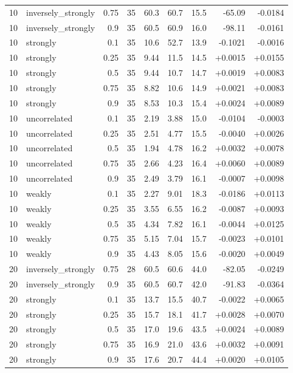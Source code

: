 \begin{tabular}{rlrrrrrrr}
10 & inversely\_strongly & 0.75 & 35 & 60.3 & 60.7 & 15.5 & -65.09 & -0.0184 \\
10 & inversely\_strongly & 0.9 & 35 & 60.5 & 60.9 & 16.0 & -98.11 & -0.0161 \\
10 & strongly & 0.1 & 35 & 10.6 & 52.7 & 13.9 & -0.1021 & -0.0016 \\
10 & strongly & 0.25 & 35 & 9.44 & 11.5 & 14.5 & +0.0015 & +0.0155 \\
10 & strongly & 0.5 & 35 & 9.44 & 10.7 & 14.7 & +0.0019 & +0.0083 \\
10 & strongly & 0.75 & 35 & 8.82 & 10.6 & 14.9 & +0.0021 & +0.0083 \\
10 & strongly & 0.9 & 35 & 8.53 & 10.3 & 15.4 & +0.0024 & +0.0089 \\
10 & uncorrelated & 0.1 & 35 & 2.19 & 3.88 & 15.0 & -0.0104 & -0.0003 \\
10 & uncorrelated & 0.25 & 35 & 2.51 & 4.77 & 15.5 & -0.0040 & +0.0026 \\
10 & uncorrelated & 0.5 & 35 & 1.94 & 4.78 & 16.2 & +0.0032 & +0.0078 \\
10 & uncorrelated & 0.75 & 35 & 2.66 & 4.23 & 16.4 & +0.0060 & +0.0089 \\
10 & uncorrelated & 0.9 & 35 & 2.49 & 3.79 & 16.1 & -0.0007 & +0.0098 \\
10 & weakly & 0.1 & 35 & 2.27 & 9.01 & 18.3 & -0.0186 & +0.0113 \\
10 & weakly & 0.25 & 35 & 3.55 & 6.55 & 16.2 & -0.0087 & +0.0093 \\
10 & weakly & 0.5 & 35 & 4.34 & 7.82 & 16.1 & -0.0044 & +0.0125 \\
10 & weakly & 0.75 & 35 & 5.15 & 7.04 & 15.7 & -0.0023 & +0.0101 \\
10 & weakly & 0.9 & 35 & 4.43 & 8.05 & 15.6 & -0.0020 & +0.0049 \\
20 & inversely\_strongly & 0.75 & 28 & 60.5 & 60.6 & 44.0 & -82.05 & -0.0249 \\
20 & inversely\_strongly & 0.9 & 35 & 60.5 & 60.7 & 42.0 & -91.83 & -0.0364 \\
20 & strongly & 0.1 & 35 & 13.7 & 15.5 & 40.7 & -0.0022 & +0.0065 \\
20 & strongly & 0.25 & 35 & 15.7 & 18.1 & 41.7 & +0.0028 & +0.0070 \\
20 & strongly & 0.5 & 35 & 17.0 & 19.6 & 43.5 & +0.0024 & +0.0089 \\
20 & strongly & 0.75 & 35 & 16.9 & 21.0 & 43.6 & +0.0032 & +0.0091 \\
20 & strongly & 0.9 & 35 & 17.6 & 20.7 & 44.4 & +0.0020 & +0.0105 \\

\end{tabular}
